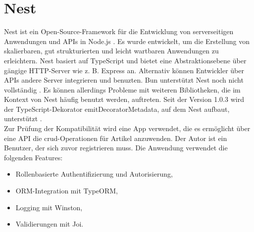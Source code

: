 \section{Nest} \label{sec:compabitility-nest}
Nest ist ein Open-Source-Framework für die Entwicklung von serverseitigen Anwendungen und APIs in Node.js \cite{Mysliwiec.2023}. Es wurde entwickelt, um die Erstellung von skalierbaren, gut strukturierten und leicht wartbaren Anwendungen zu erleichtern. Nest basiert auf TypeScript und bietet eine Abstraktionsebene über gängige HTTP-Server wie z. B. Express an. Alternativ können Entwickler über APIs andere Server integrieren und benuzten. Bun unterstützt Nest noch nicht vollständig \cite{Sumner.2022b}. Es können allerdings Probleme mit weiteren Bibliotheken, die im Kontext von Nest häufig benutzt werden, auftreten. Seit der Version 1.0.3 wird der TypeScript-Dekorator \glq emitDecoratorMetadata\grq{}, auf dem Nest aufbaut, unterstützt \cite{McDonnel.2023}.\\

\noindent
Zur Prüfung der Kompatibilität wird eine App verwendet, die es ermöglicht über eine API die \ac{crud}-Operationen für Artikel anzuwenden. Der Autor ist ein Benutzer, der sich zuvor registrieren muss. Die Anwendung verwendet die folgenden Features:

\begin{itemize}
	\item Rollenbasierte Authentifizierung und Autorisierung,
	\item ORM-Integration mit TypeORM,
	\item Logging mit Winston,
	\item Validierungen mit Joi.
\end{itemize}

